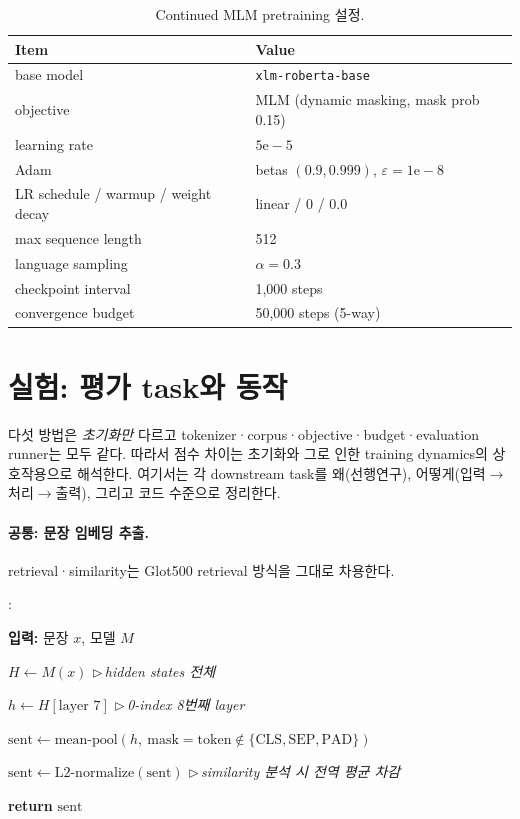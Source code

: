 \documentclass[11pt,a4paper]{article}
\newcounter{pcln}
\newenvironment{pcode}{%
  \begin{list}{\scriptsize\arabic{pcln}:}{%
    \usecounter{pcln}\small
    \setlength{\leftmargin}{2.2em}\setlength{\labelwidth}{1.6em}%
    \setlength{\itemsep}{1.5pt}\setlength{\parsep}{0pt}\setlength{\topsep}{3pt}}%
}{\end{list}}
\newcommand{\kw}[1]{\textbf{#1}}                       %
\newcommand{\cmt}[1]{\hfill{\footnotesize$\triangleright$\,\textit{#1}}}  %
\begin{document}
\begin{table}[h]\centering\small
\caption{Continued MLM pretraining 설정.}
\label{tab:mlm}
\begin{tabular}{@{}ll@{}}
\toprule
Item & Value \\
\midrule
base model & \texttt{xlm-roberta-base} \\
objective & MLM (dynamic masking, mask prob 0.15) \\
learning rate & $5\mathrm{e}{-}5$ \\
Adam & betas $(0.9,0.999)$, $\varepsilon=1\mathrm{e}{-}8$ \\
LR schedule / warmup / weight decay & linear / 0 / 0.0 \\
max sequence length & 512 \\
language sampling & $\alpha=0.3$ \\
checkpoint interval & 1{,}000 steps \\
convergence budget & 50{,}000 steps (5-way) \\
\bottomrule
\end{tabular}
\end{table}

\section{실험: 평가 task와 동작}

다섯 방법은 \emph{초기화만} 다르고 tokenizer·corpus·objective·budget·evaluation runner는 모두 같다. 따라서 점수 차이는 초기화와 그로 인한 training dynamics의 상호작용으로 해석한다. 여기서는 각 downstream task를 왜(선행연구), 어떻게(입력$\to$처리$\to$출력), 그리고 코드 수준으로 정리한다.

\paragraph{공통: 문장 임베딩 추출.} retrieval·similarity는 Glot500 retrieval 방식을 그대로 차용한다.
\begin{algorithm}[h]
\caption{문장 임베딩 추출 (Glot500 retrieval 방식)}
\begin{pcode}
\item \kw{입력:} 문장 $x$, 모델 $M$
\item $H \gets M(x)$ \cmt{hidden states 전체}
\item $h \gets H[\text{layer } 7]$ \cmt{0-index 8번째 layer}
\item $\text{sent} \gets \text{mean-pool}(h,\ \text{mask}=\text{token}\notin\{\text{CLS},\text{SEP},\text{PAD}\})$
\item $\text{sent} \gets \text{L2-normalize}(\text{sent})$ \cmt{similarity 분석 시 전역 평균 차감}
\item \kw{return} $\text{sent}$
\end{pcode}
\end{algorithm}
\end{document}
